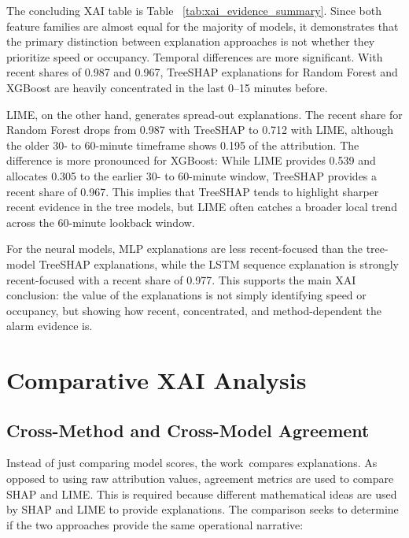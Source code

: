 \documentclass[10pt,a4paper]{article}
\begin{document}
	The concluding XAI table is Table ~\ref{tab:xai_evidence_summary}. Since both feature families are almost equal for the majority of models, it demonstrates that the primary distinction between explanation approaches is not whether they prioritize speed or occupancy. Temporal differences are more significant. With recent shares of 0.987 and 0.967, TreeSHAP explanations for Random Forest and XGBoost are heavily concentrated in the last 0–15 minutes before.
	
	\vspace{6pt}
	
	LIME, on the other hand, generates spread-out explanations. The recent share for Random Forest drops from 0.987 with TreeSHAP to 0.712 with LIME, although the older 30- to 60-minute timeframe shows 0.195 of the attribution. The difference is more pronounced for XGBoost: While LIME provides 0.539 and allocates 0.305 to the earlier 30- to 60-minute window, TreeSHAP provides a recent share of 0.967. This implies that TreeSHAP tends to highlight sharper recent evidence in the tree models, but LIME often catches a broader local trend across the 60-minute lookback window.
	
	\vspace{6pt}
	
	For the neural models, MLP explanations are less recent-focused than the tree-model TreeSHAP explanations, while the LSTM sequence explanation is strongly recent-focused with a recent share of 0.977. This supports the main XAI conclusion: the value of the explanations is not simply identifying speed or occupancy, but showing how recent, concentrated, and method-dependent the alarm evidence is.
	
	\vspace{6pt}
	
	\section{Comparative XAI Analysis}
	
	\subsection{Cross-Method and Cross-Model Agreement}
	
	Instead of just comparing model scores, the work compares explanations. As opposed to using raw attribution values, agreement metrics are used to compare SHAP and LIME. This is required because different mathematical ideas are used by SHAP and LIME to provide explanations. The comparison seeks to determine if the two approaches provide the same operational narrative:
	
\end{document}
